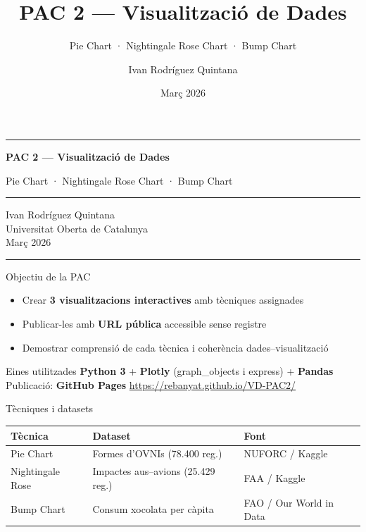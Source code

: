 \documentclass[aspectratio=169, 11pt]{beamer}
\title{PAC 2 --- Visualització de Dades}
\subtitle{Pie Chart · Nightingale Rose Chart · Bump Chart}
\author{Ivan Rodríguez Quintana}
\institute{Universitat Oberta de Catalunya}
\date{Març 2026}
\begin{document}
\begin{frame}[plain]
\centering
\vspace{1.5em}

{\color{uocblau}\rule{\textwidth}{2pt}}

\vspace{1em}
{\Large\bfseries\color{uocblau} PAC 2 --- Visualització de Dades}

\vspace{0.5em}
{\large Pie Chart · Nightingale Rose Chart · Bump Chart}

\vspace{1em}
{\color{uocblau}\rule{\textwidth}{0.5pt}}

\vspace{1.5em}
{\normalsize Ivan Rodríguez Quintana}\\[0.3em]
{\small Universitat Oberta de Catalunya}\\[0.3em]
{\small Març 2026}

\vspace{1.5em}
{\color{uocblau}\rule{\textwidth}{2pt}}
\end{frame}

\begin{frame}{Objectiu de la PAC}
\begin{itemize}
    \item Crear \textbf{3 visualitzacions interactives} amb tècniques assignades
    \item Publicar-les amb \textbf{URL pública} accessible sense registre
    \item Demostrar comprensió de cada tècnica i coherència dades--visualització
\end{itemize}

\vspace{1em}

\begin{block}{Eines utilitzades}
    \textbf{Python 3} + \textbf{Plotly} (graph\_objects i express) + \textbf{Pandas}\\
    Publicació: \textbf{GitHub Pages} \hfill
    \footnotesize{\url{https://rebanyat.github.io/VD-PAC2/}}
\end{block}
\end{frame}

\begin{frame}{Tècniques i datasets}
\begin{table}
\centering
\small
\begin{tabular}{@{}lll@{}}
\toprule
\textbf{Tècnica} & \textbf{Dataset} & \textbf{Font} \\
\midrule
Pie Chart & Formes d'OVNIs (78.400 reg.) & NUFORC / Kaggle \\
Nightingale Rose & Impactes aus--avions (25.429 reg.) & FAA / Kaggle \\
Bump Chart & Consum xocolata per càpita & FAO / Our World in Data \\
\bottomrule
\end{tabular}
\end{table}
\end{frame}
\end{document}
